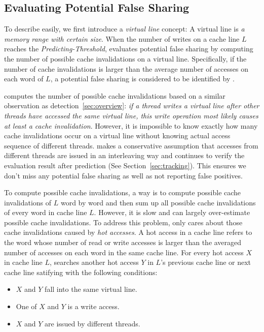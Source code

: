\subsection{Evaluating Potential False Sharing}
\label{sec:evaluatingfs}
To describe easily, we first introduce a {\it virtual line} concept:
A virtual line is {\it a memory range with certain size}.
When the number of writes on a cache line $L$ reaches the {\it Predicting-Threshold},
\Predator{} evaluates potential false sharing by computing the number of possible cache 
invalidations on a virtual line. Specifically, if the number of cache
invalidations is larger than the average number of accesses
on each word of $L$, a potential false sharing is considered to
be identified by \Predator{}.

\Predator{} computes the number of possible cache invalidations based on a 
similar observation as detection~\ref{sec:overview}: 
{\it if a thread writes a virtual line after other threads 
have accessed the same virtual line, this write operation most likely causes at least a cache 
invalidation}. 
However, it is impossible to know exactly how many cache invalidations occur on a virtual
line without knowing actual access sequence of different threads.  
\Predator{} makes a conservative assumption that 
accesses from different threads are issued in an interleaving way and
continues to verify the evaluation result after prediction (See Section~\ref{sec:tracking}).
This ensures we don't miss any potential false sharing as well as 
not reporting false positives.

To compute possible cache invalidations, a way is to compute possible 
cache invalidations of $L$ word by word and then sum up all possible cache invalidations 
of every word in cache line $L$. 
However, it is slow and can largely over-estimate possible cache invalidations.
To address this problem, \Predator{} only cares about those cache invalidations caused by
{\it hot accesses}. A hot access in a cache line refers to the word whose number of read or write accesses 
is larger than the averaged number of accesses on each word in the same cache line.
For every hot access $X$ in cache line $L$, \Predator{} searches another
hot access $Y$ in $L$'s previous cache line or next cache line satifying with
the following conditions: 

\begin{itemize}
\item
$X$ and $Y$ fall into the same virtual line. 

\item
One of $X$ and $Y$ is a write access.

\item 
$X$ and $Y$ are issued by different threads.

\end{itemize}

